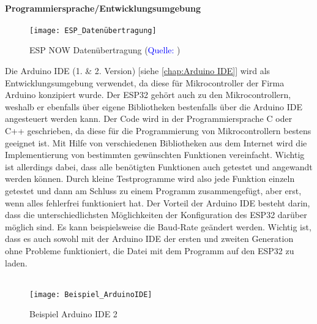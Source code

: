 \documentclass[titlepage,12pt,twoside]{article}
\begin{document}
\paragraph{Programmiersprache/Entwicklungsumgebung}
\hfill \break
\hfill \break
\begin{figure}[H]
	\begin{center}
		\scalebox{0.7}
		{\texttt{[image: ESP\_Datenübertragung]}}
		\caption{ESP NOW Datenübertragung (\textcolor{blue}{Quelle: \cite{Hsieh}})}
		\label{fig:ESP NOW Datenübertragung}			
	\end{center}
\end{figure}
\hfill \break
Die Arduino IDE (1. \& 2. Version) [siehe \textcolor{blue}{\autoref{chap:Arduino IDE}}] wird als Entwicklungsumgebung verwendet, da diese für Mikrocontroller der Firma Arduino 
konzipiert wurde. Der ESP32 gehört auch zu den Mikrocontrollern, weshalb er ebenfalls über eigene Bibliotheken bestenfalls 
über die Arduino IDE angesteuert werden kann. Der Code wird in der Programmiersprache C oder C++ geschrieben, da diese für 
die Programmierung von Mikrocontrollern bestens geeignet ist. Mit Hilfe von verschiedenen Bibliotheken aus dem Internet wird 
die Implementierung von bestimmten gewünschten Funktionen vereinfacht. Wichtig ist allerdings dabei, dass alle benötigten 
Funktionen auch getestet und angewandt werden können. Durch kleine Testprogramme wird also jede Funktion einzeln getestet und 
dann am Schluss zu einem Programm zusammengefügt, aber erst, wenn alles fehlerfrei funktioniert hat. Der Vorteil der Arduino 
IDE besteht darin, dass die unterschiedlichsten Möglichkeiten der Konfiguration des ESP32 darüber möglich sind. Es kann 
beispielsweise die Baud-Rate geändert werden. Wichtig ist, dass es auch sowohl mit der Arduino IDE der ersten und zweiten 
Generation ohne Probleme funktioniert, die Datei mit dem Programm auf den ESP32 zu laden. \\
\\
\begin{figure}[H]
	\begin{center}
		\scalebox{0.7}
		{\texttt{[image: Beispiel\_ArduinoIDE]}}
		\caption{Beispiel Arduino IDE 2}
		\label{fig:Beispiel_ArduinoIDE}			
	\end{center}
\end{figure}
\end{document}
